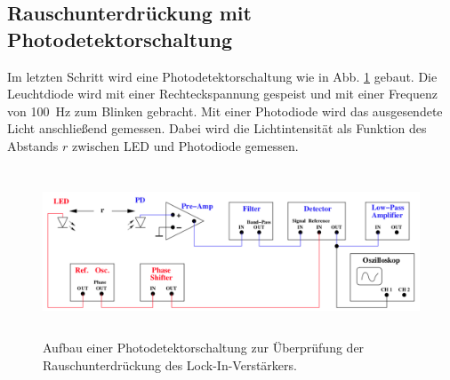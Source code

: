 \subsection{Rauschunterdrückung mit Photodetektorschaltung} %
Im letzten Schritt wird eine Photodetektorschaltung wie in Abb. \ref{lockin3} gebaut.
Die Leuchtdiode wird mit einer Rechteckspannung gespeist und mit einer Frequenz von \SI{100}{\hertz} zum Blinken gebracht.
Mit einer Photodiode wird das ausgesendete Licht anschließend gemessen.
Dabei wird die Lichtintensität als Funktion des Abstands $r$ zwischen LED und Photodiode gemessen.
\begin{figure}
    \centering
    \includegraphics[width=12cm, height=5cm]{build/lockin3.png}
    \caption{Aufbau einer Photodetektorschaltung zur Überprüfung der
    Rauschunterdrückung des Lock-In-Verstärkers. \cite{V303}}
    \label{lockin3}
\end{figure}
